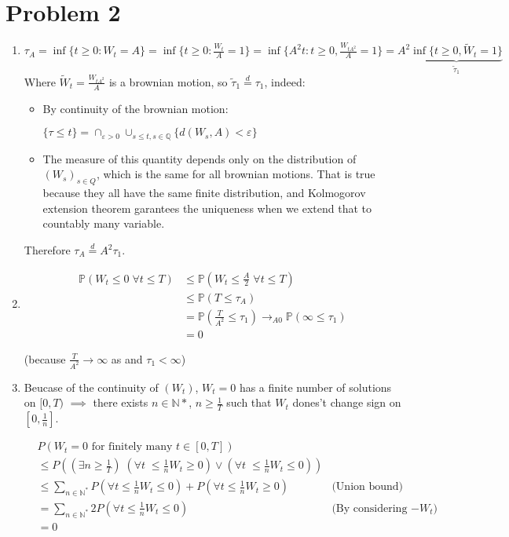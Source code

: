 \documentclass[12pt]{article}
\newenvironment{problem}[1]
{\section*{Problem #1}}{}
\begin{document}
\begin{problem}{2}
  \begin{enumerate}
  \item
    $\tau_A = \inf \{ t \ge 0: W_t = A \} = \inf \{ t \ge 0:
    \frac{W_t}{A} = 1 \} = \inf \{ A^2 t : t \ge 0, \frac{W_{tA^2}}A = 1 \} = A^2 \underbrace{\inf\{ t \ge 0, \tilde
      W_t = 1 \}}_{\tilde \tau_1} $ Where
    $\tilde W_t = \frac{W_{tA^2}}{A}$ is a brownian motion,
    so $ \tilde \tau_1 \overset{d}{=} \tau_1$, indeed:
    \begin{itemize}
    \item By continuity of the brownian motion:
    
      $\{\tau \le t\} = \cap_{\varepsilon > 0} \cup_{s \le t, s \in
        \mathbb Q} \{d(W_s, A) < \varepsilon\}$
    
    \item       The measure of this quantity depends only on the distribution of
      $(W_s)_{s \in Q}$, which is the same for all brownian motions.
      That is true because they all have the same finite distribution,
      and Kolmogorov extension theorem garantees the uniqueness when
      we extend that to countably many variable.
    \end{itemize}
    
    Therefore
    $\tau_A \overset{d}{=}A^2 \tau_1$.
  \item
    \begin{align*}
   \mathbb P (W_t \le 0 \; \forall t \le T) &\le \mathbb P (W_t \le\frac{A}2 \; \forall t \le T)
      \\&\le \mathbb P(T \le \tau_A)
      \\&= \mathbb P(\frac{T}{A^2} \le \tau_1) \rightarrow_{A 0} \mathbb P(\infty \le \tau_1)
      \\&= 0
    \end{align*}

    (because $\frac{T}{A^2} \rightarrow \infty$ as and $\tau_1 < \infty$)
    
  \item

    Beucase of the continuity of $(W_t)$, $W_t = 0 $ has a finite  number of solutions on $[0, T)$ $\implies $ there exists  $n \in \mathbb{N*}$, $n \ge \frac1{T}$ such that $W_t$   dones't change sign on $[0, \frac1n]$.

  \begin{align*}
    &P(W_t = 0 \text{ for finitely many } t \in [0, T]) \\&\le P((\exists n \ge \frac1{T}) \; (\forall t \; \le \frac1n W_t \ge 0) \vee (\forall t \; \le \frac1n W_t \le 0)   )
    \\& \le \sum_{n \in \mathbb{N^*}} P(\forall t \le \frac1n   W_t \le 0) + P(\forall t \le \frac1n   W_t \ge 0) &\text{(Union bound)}
    \\&= \sum_{n \in \mathbb{N^*}} 2 P(\forall t \le \frac1n   W_t \le 0) &\text{(By considering $-W_t$)}
    \\&=0
  \end{align*}

\end{enumerate}


\end{problem}
\end{document}
